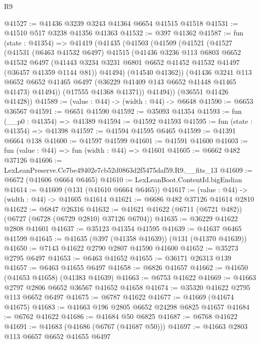 \begin{lexlean}{R9}
\begin{coremodule}
@41527 := @41436 @3239 @3243 @41364 @6654 @41515 @41518
@41531 := @41510 @517 @3238 @41356 @41363
@41532 := @397 @41362
@41587 := fun (state : @41354) =>
  @41419
    (@41435
      (@41503
        (@41509
          (@41521
            (@41527
              (@41531
                (@6463 @41532 @6497)
                @41515
                (@41436
                  @3236
                  @113
                  @6803
                  @6652
                  @41532
                  @6497
                  (@41443 @3234 @3231 @6801 @6652 @41452 @41532 @41497 (@36457 @41359 @1144 @81))
                  @41494)
                (@14540 @41362))
              (@41436
                @3241
                @113
                @6652
                @6652
                @41465
                @6497
                (@36229 @41409 @143 @6652 @41448 @41465 @41473)
                @41494))
            (@17555 @41368 @41371))
          @41494))
      (@36551 @41426 @41428))
@41589 := (value : @44) -> (width : @44) -> @6648
@41590 := @6653 @36567
@41591 := @6651 @41590
@41592 := @35093 @41354
@41593 := fun (__p0 : @41354) => @41389
@41594 := @41592 @41593
@41595 := fun (state : @41354) => @41398
@41597 := @41594 @41595 @6465
@41599 := @41391 @6664 @138
@41600 := @41597 @41599
@41601 := @41591 @41600
@41603 := fun (value : @44) => fun (width : @44) => @41601
@41605 := @6662 @482 @37126
@41606 := LexLeanPreserve.Ce7be49402e7cb52d0863d2f5475daf59.R9.__fits_13
@41609 := @6672 (@41606 @6664 @6465)
@41610 := LexLeanBoot.ContentId.bigEndian
@41614 := @41609 (@131 (@41610 @6664 @6465))
@41617 := (value : @44) -> (width : @44) -> @41605 @41614
@41621 := @6686 @482 @37126 @41614 @2810
@41622 := @6847 @26316
@41632 := @41621 @41622 (@6711 (@6721 @482)) (@6727 (@6728 (@6729 @2810) @37126 @6704))
@41635 := @36229 @41622 @2808 @41601
@41637 := @35123 @41354 @41595
@41639 := @41637 @6465 @41599
@41645 := @41635 (@397 (@41358 @41639)) (@131 (@41370 @41639))
@41650 := @7143 @41622 @2790 @2807 @41590 @41600
@41652 := @35273 @2795 @6497
@41653 := @6463 @41652
@41655 := @36171 @26313 @139
@41657 := @6463 @41655 @6497
@41658 := @6826 @41657
@41662 := @41650 (@41653 @41658) (@41383 @41639)
@41663 := @6753 @41622
@41669 := @41663 @2797 @2806 @6652 @36567 @41652 @41658
@41674 := @35320 @41622 @2795 @113 @6652 @6497
@41675 := @6787 @41622
@41677 := @41669 (@41674 @41675)
@41683 := @41663 @196 @2805 @6652 @24298 @6825 @41657
@41684 := @6762 @41622
@41686 := @41684 @50 @6825
@41687 := @6768 @41622
@41691 := @41683 (@41686 (@6767 (@41687 @50)))
@41697 := @41663 @2803 @113 @6657 @6652 @41655 @6497

\end{coremodule}
\end{lexlean}
